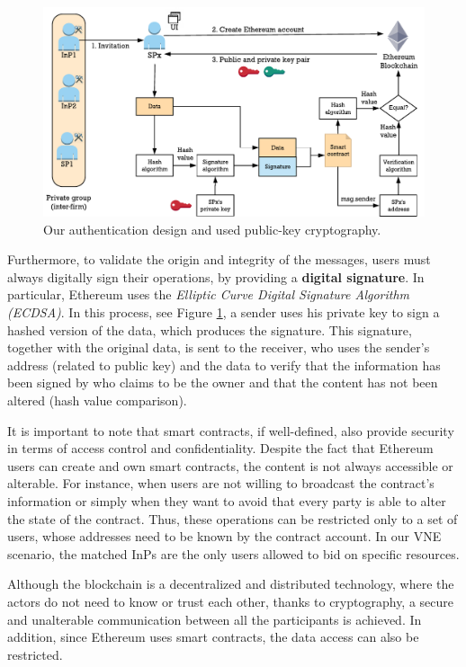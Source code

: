 \begin{figure}[bth]
	\centering
	\includegraphics[scale=0.8]{gfx/authentication_design}    
  	\caption{Our authentication design and used public-key cryptography.}
  	\label{fig:authenticationDesign}
\end{figure}

Furthermore, to validate the origin and integrity of the messages, users must always digitally sign their operations, by providing a \textbf{digital signature}. In particular, Ethereum uses the \textit{Elliptic Curve Digital Signature Algorithm (ECDSA)}. In this process, see Figure \ref{fig:authenticationDesign}, a sender uses his private key to sign a hashed version of the data, which produces the signature. This signature, together with the original data, is sent to the receiver, who uses the sender's address (related to public key) and the data to verify that the information has been signed by who claims to be the owner and that the content has not been altered (hash value comparison).

It is important to note that smart contracts, if well-defined, also provide security in terms of access control and confidentiality. Despite the fact that Ethereum users can create and own smart contracts, the content is not always accessible or alterable. For instance, when users are not willing to broadcast the contract's information or simply when they want to avoid that every party is able to alter the state of the contract. Thus, these operations can be restricted only to a set of users, whose addresses need to be known by the contract account. In our VNE scenario, the matched InPs are the only users allowed to bid on specific resources.

Although the blockchain is a decentralized and distributed technology, where the actors do not need to know or trust each other, thanks to cryptography, a secure and unalterable communication between all the participants is achieved. In addition, since Ethereum uses smart contracts, the data access can also be restricted.

